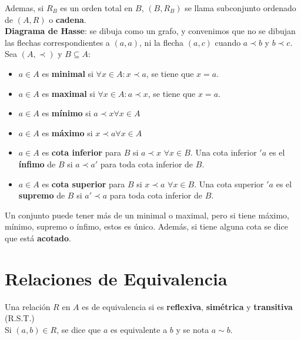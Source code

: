 \documentclass[11pt,a4paper]{article}
\begin{document}
\noindent Ademas, si $R_B$ es un orden total en $B$, $(B, R_B)$ se llama subconjunto ordenado de $(A, R)$ o \textbf{cadena}.\\

\noindent \textbf{Diagrama de Hasse}: se dibuja como un grafo, y convenimos que no se dibujan las flechas correspondientes a $(a,a)$, ni la flecha $(a,c)$ cuando $a \prec b$ y $b \prec c$.\\

\noindent Sea $(A, \prec)$ y $B \subseteq A$:
\begin{itemize}
\item $a \in A$ es \textbf{minimal} si $\forall x \in A : x\prec a$, se tiene que $x = a$.
\item $a \in A$ es \textbf{maximal} si $\forall x \in A : a\prec x$, se tiene que $x = a$.\\

\item $a \in A$ es \textbf{m\'inimo} si $a \prec x \forall x \in A$
\item $a \in A$ es \textbf{m\'aximo} si $x \prec a \forall x \in A$\\

\item $a \in A$ es \textbf{cota inferior} para $B$ si $a \prec x$ $\forall x \in B$. Una cota inferior $'a$ es el \textbf{\'infimo} de $B$ si $a \prec a'$ para toda cota inferior de $B$.
\item $a \in A$ es \textbf{cota superior} para $B$ si $x \prec a$ $\forall x \in B$. Una cota superior $'a$ es el \textbf{supremo} de $B$ si $a' \prec a$ para toda cota inferior de $B$.\\
\end{itemize}
\noindent Un conjunto puede tener m\'as de un minimal o maximal, pero si tiene m\'aximo, m\'inimo, supremo o \'infimo, estos es \'unico. Adem\'as, si tiene alguna cota se dice que est\'a \textbf{acotado}.

\newpage
\section{Relaciones de Equivalencia}
\noindent Una relaci\'on $R$ en $A$ es de equivalencia si es \textbf{reflexiva}, \textbf{sim\'etrica} y \textbf{transitiva} (R.S.T.)\\

\noindent Si $(a,b) \in R$, se dice que $a$ es equivalente a $b$ y se nota $a \sim b$.\\
\end{document}
